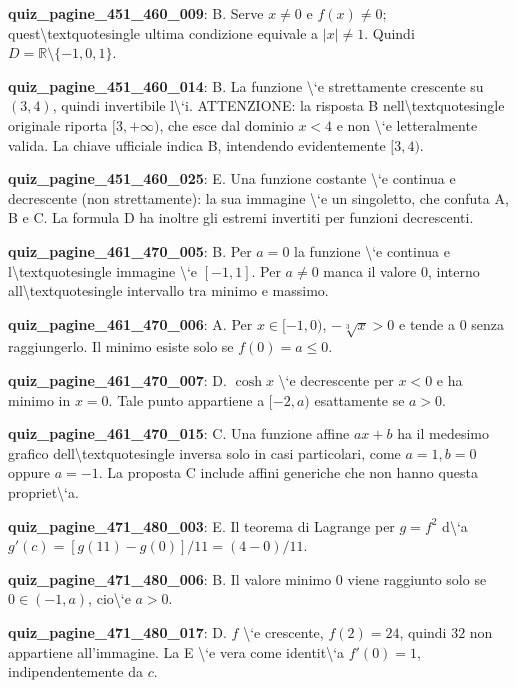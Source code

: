 \documentclass[11pt,a4paper]{article}
\newcounter{quiz}
\begin{document}
\noindent\textbf{quiz\_pagine\_451\_460\_009}: B. Serve $x\ne0$ e $f(x)\ne0$; quest\textbackslash{}textquotesingle ultima condizione equivale a $|x|\ne1$. Quindi $D=\mathbb R\setminus\{-1,0,1\}$.\par\medskip
\noindent\textbf{quiz\_pagine\_451\_460\_014}: B. La funzione \textbackslash{}`e strettamente crescente su $(3,4)$, quindi invertibile l\textbackslash{}`i. ATTENZIONE: la risposta B nell\textbackslash{}textquotesingle originale riporta $[3,+\infty)$, che esce dal dominio $x<4$ e non \textbackslash{}`e letteralmente valida. La chiave ufficiale indica B, intendendo evidentemente $[3,4)$.\par\medskip
\noindent\textbf{quiz\_pagine\_451\_460\_025}: E. Una funzione costante \textbackslash{}`e continua e decrescente (non strettamente): la sua immagine \textbackslash{}`e un singoletto, che confuta A, B e C. La formula D ha inoltre gli estremi invertiti per funzioni decrescenti.\par\medskip
\noindent\textbf{quiz\_pagine\_461\_470\_005}: B. Per $a=0$ la funzione \textbackslash{}`e continua e l\textbackslash{}textquotesingle immagine \textbackslash{}`e $[-1,1]$. Per $a\neq0$ manca il valore $0$, interno all\textbackslash{}textquotesingle intervallo tra minimo e massimo.\par\medskip
\noindent\textbf{quiz\_pagine\_461\_470\_006}: A. Per $x\in[-1,0)$, $-\sqrt[3]{x}>0$ e tende a $0$ senza raggiungerlo. Il minimo esiste solo se $f(0)=a\le0$.\par\medskip
\noindent\textbf{quiz\_pagine\_461\_470\_007}: D. $\cosh x$ \textbackslash{}`e decrescente per $x<0$ e ha minimo in $x=0$. Tale punto appartiene a $[-2,a)$ esattamente se $a>0$.\par\medskip
\noindent\textbf{quiz\_pagine\_461\_470\_015}: C. Una funzione affine $ax+b$ ha il medesimo grafico dell\textbackslash{}textquotesingle inversa solo in casi particolari, come $a=1,b=0$ oppure $a=-1$. La proposta C include affini generiche che non hanno questa propriet\textbackslash{}`a.\par\medskip
\noindent\textbf{quiz\_pagine\_471\_480\_003}: E. Il teorema di Lagrange per $g=f^2$ d\textbackslash{}`a $g'(c)=[g(11)-g(0)]/11=(4-0)/11$.\par\medskip
\noindent\textbf{quiz\_pagine\_471\_480\_006}: B. Il valore minimo $0$ viene raggiunto solo se $0\in(-1,a)$, cio\textbackslash{}`e $a>0$.\par\medskip
\noindent\textbf{quiz\_pagine\_471\_480\_017}: D. $f$ \textbackslash{}`e crescente, $f(2)=24$, quindi $32$ non appartiene all'immagine. La E \textbackslash{}`e vera come identit\textbackslash{}`a $f'(0)=1$, indipendentemente da $c$.\par\medskip
\end{document}
